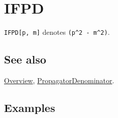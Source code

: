 \documentclass[../FeynCalcManual.tex]{subfiles}
\begin{document}
\hypertarget{ifpd}{
\section{IFPD}\label{ifpd}}

\texttt{IFPD[\allowbreak{}p,\ \allowbreak{}m]} denotes
\texttt{(p^2 - m^2)}.

\subsection{See also}

\hyperlink{toc}{Overview},
\hyperlink{propagatordenominator}{PropagatorDenominator}.

\subsection{Examples}
\end{document}
